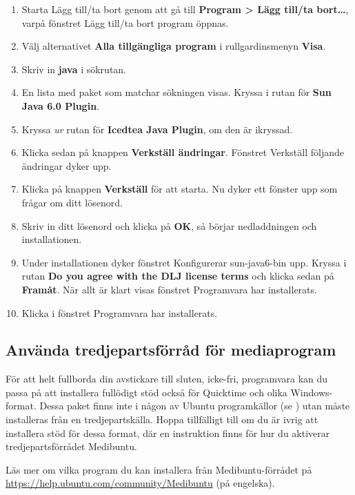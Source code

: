 \documentclass[a4paper,final]{memoir} %
\begin{document}
\begin{enumerate}

\item Starta Lägg till/ta bort genom att gå till \textbf{Program \textgreater{} Lägg till/ta bort\ldots{}}, varpå fönstret Lägg till/ta bort program öppnas.
\item Välj alternativet \textbf{Alla tillgängliga program} i rullgardinsmenyn \textbf{Visa}. 
\item Skriv in \textbf{java} i sökrutan. 
\item En lista med paket som matchar sökningen visas. Kryssa i rutan för \textbf{Sun Java 6.0 Plugin}.
\item Kryssa \textit{ur} rutan för \textbf{Icedtea Java Plugin}, om den är ikryssad.
\item Klicka sedan på knappen \textbf{Verkställ ändringar}. Fönstret Verkställ följande ändringar dyker upp.
\item Klicka på knappen \textbf{Verkställ} för att starta. Nu dyker ett fönster upp som frågar om ditt lösenord.
\item Skriv in ditt lösenord och klicka på \textbf{OK}, så börjar nedladdningen och installationen. 
\item Under installationen dyker fönstret Konfigurerar sun-java6-bin upp. Kryssa i rutan \textbf{Do you agree with the DLJ license terms} och klicka sedan på \textbf{Framåt}. När allt är klart visas fönstret Programvara har installerats. 
\item Klicka \xstang{} i fönstret Programvara har installerats. 

\end{enumerate}

\subsection{Använda tredjepartsförråd för mediaprogram}\label{medibuntu}

För att helt fullborda din avstickare till sluten, icke-fri, programvara kan du passa på att installera fullödigt stöd också för Quicktime och olika Windows-format. Dessa paket finns inte i någon av Ubuntu programkällor (se ) utan måste installeras från en tredjepartskälla. Hoppa tillfälligt till  om du är ivrig att installera stöd för dessa format, där en instruktion finns för hur du aktiverar tredjepartsförrådet Medibuntu.

Läs mer om vilka program du kan installera från Medibuntu-förrådet på \url{https://help.ubuntu.com/community/Medibuntu} (på engelska).
\end{document}
